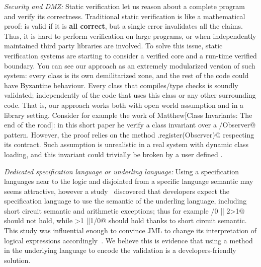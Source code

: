 \noindent\textit{Security and DMZ:}
Static verification let us reason about a complete program
and verify its correctness.
Traditional static verification is like a mathematical proof: is valid if it is \textbf{all correct},
but a single error invalidates all the claims.
Thus, it is hard to perform verification on large programs, or when independently
maintained third party libraries are involved.
To solve this issue, static verification systems are starting to consider a verified core
and a run-time verified boundary.
You can see our approach as an extremely modularized version of such system:
every class is its own demilitarized zone, and the rest of the code 
could have Byzantine behaviour.
Every class that compiles/type checks is soundly validated;
independently of the code that uses this class or any other surrounding code.
That is, our approach works both with open world assumption and in a library setting.
Consider for example the work of Matthew[Class Invariants: The end of the road]:
in this short paper he verify a \Q@Observer@ class invariant over
a \Q@Subject/Observer@ pattern.
However, the proof relies on the method \Q@Subject.register(Observer)@ respecting its contract.
Such assumption is unrealistic in a real system with dynamic class loading,
and this invariant could trivially be broken by a user defined \Q@EvilSubject@.


\noindent\textit{Dedicated specification language or underling language:}
Using a specification languages near to the logic and disjointed from a specific language
semantic may seems attractive, however
a study~\cite{chalin2007logical} discovered that developers expect
the specification language to use the semantic of the underling language, including
short circuit semantic and arithmetic exceptions; thus for example
/0 || 2>1@
should not hold, while 
>1 ||1/0@ should hold thanks to short circuit semantic.
This study was influential enough to convince JML to change its interpretation of logical expressions
accordingly~\cite{chalin2008jml}.
We believe this is evidence that using a method in the underlying language to encode the validation is
a developers-friendly solution.










